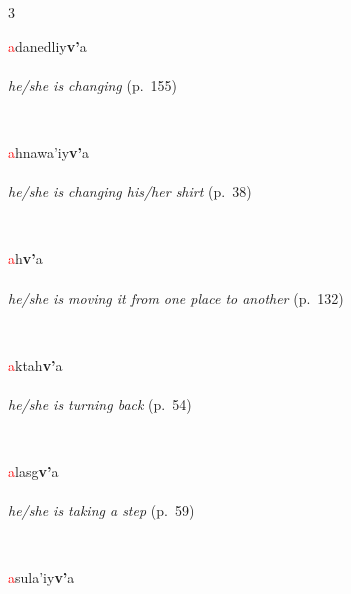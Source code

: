 \documentclass[oneside,openany]{book}%
\begin{document}
\noindent\begin{multicols}{3}%
\begin{minipage}[t]{\linewidth}
\raggedright\noindent \textcolor{Red}{a}danedliy\textbf{v'}a\\
\\
\noindent \textit{he/she is changing} (p.~155)
\end{minipage}\\[1em]%
\begin{minipage}[t]{\linewidth}
\raggedright\noindent \textcolor{Red}{a}hnawa'iy\textbf{v'}a\\
\\
\noindent \textit{he/she is changing his/her shirt} (p.~38)
\end{minipage}\\[1em]%
\begin{minipage}[t]{\linewidth}
\raggedright\noindent \textcolor{Red}{a}h\textbf{v'}a\\
\\
\noindent \textit{he/she is moving it from one place to another} (p.~132)
\end{minipage}\\[1em]%
\begin{minipage}[t]{\linewidth}
\raggedright\noindent \textcolor{Red}{a}ktah\textbf{v'}a\\
\\
\noindent \textit{he/she is turning back} (p.~54)
\end{minipage}\\[1em]%
\begin{minipage}[t]{\linewidth}
\raggedright\noindent \textcolor{Red}{a}lasg\textbf{v'}a\\
\\
\noindent \textit{he/she is taking a step} (p.~59)
\end{minipage}\\[1em]%
\begin{minipage}[t]{\linewidth}
\raggedright\noindent \textcolor{Red}{a}sula'iy\textbf{v'}a\\
\\

\end{minipage}
\end{multicols}
\end{document}
